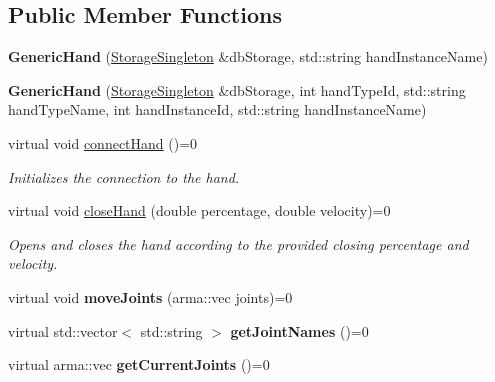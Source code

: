 \subsection*{Public Member Functions}
\begin{DoxyCompactItemize}
\item 
{\bfseries Generic\+Hand} (\hyperlink{classkukadu_1_1StorageSingleton}{Storage\+Singleton} \&db\+Storage, std\+::string hand\+Instance\+Name)\hypertarget{classkukadu_1_1GenericHand_aa249fecba3926e7c8e2d313b68be37e1}{}\label{classkukadu_1_1GenericHand_aa249fecba3926e7c8e2d313b68be37e1}

\item 
{\bfseries Generic\+Hand} (\hyperlink{classkukadu_1_1StorageSingleton}{Storage\+Singleton} \&db\+Storage, int hand\+Type\+Id, std\+::string hand\+Type\+Name, int hand\+Instance\+Id, std\+::string hand\+Instance\+Name)\hypertarget{classkukadu_1_1GenericHand_acc1027f8a563e38c6b8dee0163b3ae66}{}\label{classkukadu_1_1GenericHand_acc1027f8a563e38c6b8dee0163b3ae66}

\item 
virtual void \hyperlink{classkukadu_1_1GenericHand_a965ed8a8d225fb36eabf5089fa5d4f32}{connect\+Hand} ()=0
\begin{DoxyCompactList}\small\item\em Initializes the connection to the hand. \end{DoxyCompactList}\item 
virtual void \hyperlink{classkukadu_1_1GenericHand_a000e4d03e93f50d7101c50e6096d28a0}{close\+Hand} (double percentage, double velocity)=0
\begin{DoxyCompactList}\small\item\em Opens and closes the hand according to the provided closing percentage and velocity. \end{DoxyCompactList}\item 
virtual void {\bfseries move\+Joints} (arma\+::vec joints)=0\hypertarget{classkukadu_1_1GenericHand_a7662305094e40833ef22e6675e41c5fd}{}\label{classkukadu_1_1GenericHand_a7662305094e40833ef22e6675e41c5fd}

\item 
virtual std\+::vector$<$ std\+::string $>$ {\bfseries get\+Joint\+Names} ()=0\hypertarget{classkukadu_1_1GenericHand_aa562dea13207e605ee489e774e061fbb}{}\label{classkukadu_1_1GenericHand_aa562dea13207e605ee489e774e061fbb}

\item 
virtual arma\+::vec {\bfseries get\+Current\+Joints} ()=0\hypertarget{classkukadu_1_1GenericHand_a3e18d7bfb6e3b19fde791d245d589a11}{}\label{classkukadu_1_1GenericHand_a3e18d7bfb6e3b19fde791d245d589a11}


\end{DoxyCompactItemize}

